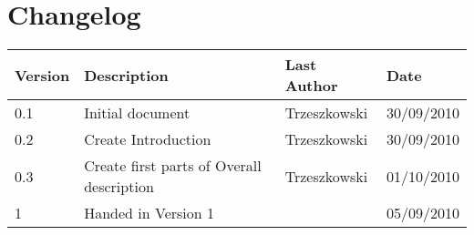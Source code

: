 \section*{Changelog}

\begin{table}[h!]
	\begin{center}
		\begin{tabular}{|l|l|l|l|}
			\hline
			\rowcolor{fontys_pink_light}Version	&Description	&Last Author	&Date\\
			\hline
			0.1	&Initial document	&Trzeszkowski	&30/09/2010\\
			\hline
			0.2	&Create Introduction	&Trzeszkowski	&30/09/2010\\
			\hline
			0.3	&Create first parts of Overall description	&Trzeszkowski	&01/10/2010\\
			\hline
			\rowcolor{fontysgreen2}1	& Handed in Version 1 & &05/09/2010\\

		\hline
		\end{tabular}
	\end{center}
	\label{tab:changelog}
\end{table}
